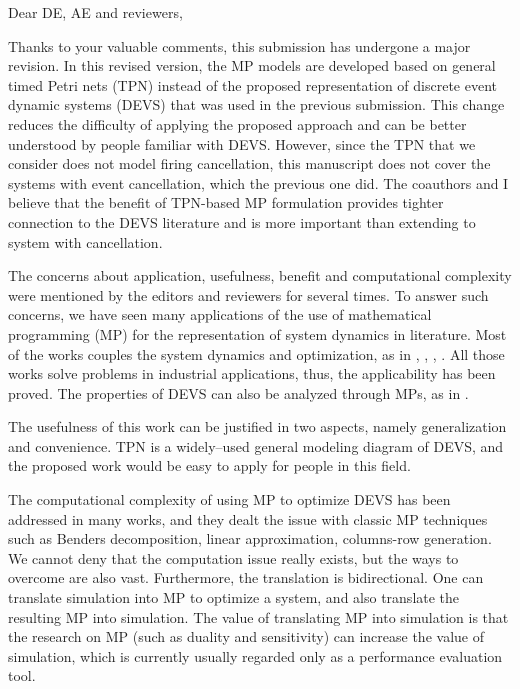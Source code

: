 \documentclass[suppldata]{interact}
\begin{document}
\noindent
Dear DE, AE and reviewers,

Thanks to your valuable comments, this submission has undergone a major revision. In this revised version, the MP models are developed based on general timed Petri nets (TPN) instead of the proposed representation of discrete event dynamic systems (DEVS) that was used in the previous submission. This change reduces the difficulty of applying the proposed approach and can be better understood by people familiar with DEVS. However, since the TPN that we consider does not model firing cancellation, this manuscript does not cover the systems with event cancellation, which the previous one did. The coauthors and I believe that the benefit of TPN-based MP formulation provides tighter connection to the DEVS literature and is more important than extending to system with cancellation.


The concerns about application, usefulness, benefit and computational complexity were mentioned by the editors and reviewers for several times. To answer such concerns, we have seen many applications of the use of mathematical programming (MP) for the representation of system dynamics in literature. Most of the works couples the system dynamics and optimization, as in \cite{di2020makespan}, \cite{weiss2015buffer}, \cite{bemporad1999control}, \cite{alfieri2020time}. All those works solve problems in industrial applications, thus, the applicability has been proved. The properties of DEVS can also be analyzed through MPs, as in \cite{basile2012k}.


The usefulness %
of this work can be justified in two aspects, namely generalization and convenience. TPN is a widely--used general modeling diagram of DEVS, and the proposed work would be easy to apply for people in this field.


The computational complexity of using MP to optimize DEVS has been %
addressed in many works, and they dealt the issue with classic MP techniques such as Benders decomposition, linear approximation, columns-row generation. We cannot deny that the computation issue really exists, but the ways to overcome are also vast. Furthermore, the translation is bidirectional. One can translate simulation into MP to optimize a system, and also translate the resulting MP into simulation. The value of translating MP into simulation is that the research on MP (such as duality and sensitivity) can %
increase the value of simulation, which is currently usually regarded only as a performance evaluation tool. 
\end{document}
